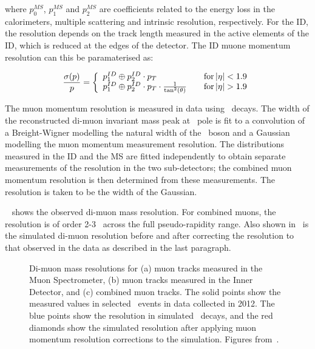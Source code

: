 where  $p_{0}^{MS}$, $p_{1}^{MS}$ and $p_{2}^{MS}$ are coefficients related to
the energy loss in the calorimeters, multiple scattering and intrinsic
resolution, respectively. For the ID, the resolution depends on the track length
measured in the active elements of the ID, which is reduced at the edges of the
detector. The ID muone momentum resolution can this be paramaterised as:

\begin{equation}
\frac{ \sigma (p) }{ p } = \left\{
    \begin{array}{l l}
        p_{1}^{ID} \oplus  p_{2}^{ID} \cdot p_{T}  & \quad {\rm
for}\, \modetalt{1.9} \\
    p_{1}^{ID} \oplus  p_{2}^{ID} \cdot p_{T} \cdot
\frac{1}{\tan ^{2} (\theta)}  & \quad {\rm for}\, \modetagt{1.9} \\
  \end{array} \right.
\end{equation}

The muon momentum resolution is measured in data using \Zmm\ decays. The width
of the reconstructed di-muon invariant mass peak at \Z\ pole is fit to a
convolution of a Breight-Wigner modelling the natural width of the \Z\ boson and
a Gaussian modelling the muon momentum measurement resolution. The
distributions measured in the ID and the MS are fitted independently to obtain
separate measurements of the resolution in the two sub-detectors; the combined
muon momentum resolution is then determined from these measurements. The
resolution is taken to be the width of the Gaussian.

~ shows the observed di-muon mass resolution. For
combined muons, the resolution is of order 2-3 \gev\ across the full
pseudo-rapidity range. Also shown in~ is the simulated
di-muon resolution before and after correcting the resolution to that observed
in the data as described in the last paragraph.

\begin{figure}[h]
\centering
\caption{Di-muon mass resolutions for (a) muon tracks measured in the Muon
Spectrometer, (b) muon tracks measured in the Inner Detector, and (c) combined muon
tracks. The solid points show the measured values in selected \Zmm\ events in data collected in 2012. The
blue points show the resolution in simulated \Zmm\ decays, and the red diamonds
show the simulated resolution after applying muon momentum resolution corrections to the simulation. Figures from~\cite{MuonPerfPlots2012}.}
\label{fig:mu-resolution-dimu}
\end{figure}

